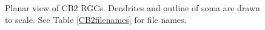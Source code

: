\documentclass{article}
\begin{document}
\pagestyle{empty}


\newcommand{\beginsupplement}{%
  \setcounter{table}{0}
  \renewcommand{\thetable}{S\arabic{table}}%
  \setcounter{figure}{0}
  \renewcommand{\thefigure}{S\arabic{figure}}%
}

\beginsupplement

%
%


\begin{figure}
  \centering
  \label{CB2planar}
  \caption{Planar view of CB2 RGCs. Dendrites and outline of soma are
    drawn to scale. See Table \ref{CB2filenames} for file names.}
\end{figure}
\end{document}
